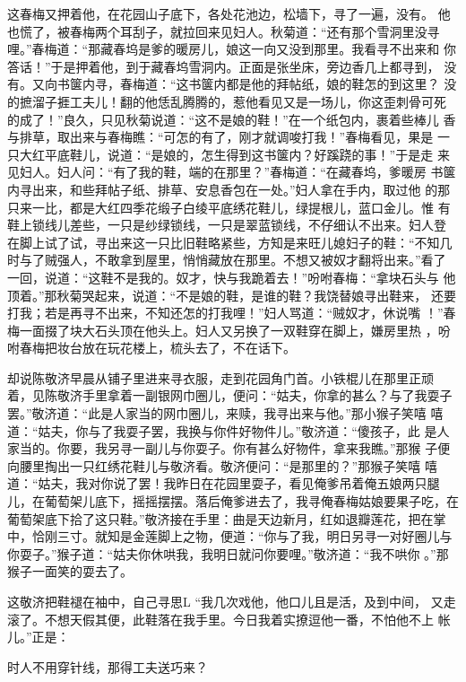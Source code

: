 这春梅又押着他，在花园山子底下，各处花池边，松墙下，寻了一遍，没有。
他也慌了，被春梅两个耳刮子，就拉回来见妇人。秋菊道：“还有那个雪洞里没寻
哩。”春梅道：“那藏春坞是爹的暖房儿，娘这一向又没到那里。我看寻不出来和
你答话！”于是押着他，到于藏春坞雪洞内。正面是张坐床，旁边香几上都寻到，
没有。又向书箧内寻，春梅道：“这书箧内都是他的拜帖纸，娘的鞋怎的到这里？
没的摭溜子捱工夫儿！翻的他恁乱腾腾的，惹他看见又是一场儿，你这歪刺骨可死
的成了！”良久，只见秋菊说道：“这不是娘的鞋！”在一个纸包内，裹着些棒儿
香与排草，取出来与春梅瞧：“可怎的有了，刚才就调唆打我！”春梅看见，果是
一只大红平底鞋儿，说道：“是娘的，怎生得到这书箧内？好蹊跷的事！”于是走
来见妇人。妇人问：“有了我的鞋，端的在那里？”春梅道：“在藏春坞，爹暖房
书箧内寻出来，和些拜帖子纸、排草、安息香包在一处。”妇人拿在手内，取过他
的那只来一比，都是大红四季花缎子白绫平底绣花鞋儿，绿提根儿，蓝口金儿。惟
有鞋上锁线儿差些，一只是纱绿锁线，一只是翠蓝锁线，不仔细认不出来。妇人登
在脚上试了试，寻出来这一只比旧鞋略紧些，方知是来旺儿媳妇子的鞋：“不知几
时与了贼强人，不敢拿到屋里，悄悄藏放在那里。不想又被奴才翻将出来。”看了
一回，说道：“这鞋不是我的。奴才，快与我跪着去！”吩咐春梅：“拿块石头与
他顶着。”那秋菊哭起来，说道：“不是娘的鞋，是谁的鞋？我饶替娘寻出鞋来，
还要打我；若是再寻不出来，不知还怎的打我哩！”妇人骂道：“贼奴才，休说嘴
！”春梅一面掇了块大石头顶在他头上。妇人又另换了一双鞋穿在脚上，嫌房里热
，吩咐春梅把妆台放在玩花楼上，梳头去了，不在话下。

却说陈敬济早晨从铺子里进来寻衣服，走到花园角门首。小铁棍儿在那里正顽
着，见陈敬济手里拿着一副银网巾圈儿，便问：“姑夫，你拿的甚么？与了我耍子
罢。”敬济道：“此是人家当的网巾圈儿，来赎，我寻出来与他。”那小猴子笑嘻
嘻道：“姑夫，你与了我耍子罢，我换与你件好物件儿。”敬济道：“傻孩子，此
是人家当的。你要，我另寻一副儿与你耍子。你有甚么好物件，拿来我瞧。”那猴
子便向腰里掏出一只红绣花鞋儿与敬济看。敬济便问：“是那里的？”那猴子笑嘻
嘻道：“姑夫，我对你说了罢！我昨日在花园里耍子，看见俺爹吊着俺五娘两只腿
儿，在葡萄架儿底下，摇摇摆摆。落后俺爹进去了，我寻俺春梅姑娘要果子吃，在
葡萄架底下拾了这只鞋。”敬济接在手里：曲是天边新月，红如退瓣莲花，把在掌
中，恰刚三寸。就知是金莲脚上之物，便道：“你与了我，明日另寻一对好圈儿与
你耍子。”猴子道：“姑夫你休哄我，我明日就问你要哩。”敬济道：“我不哄你
。”那猴子一面笑的耍去了。

这敬济把鞋褪在袖中，自己寻思L “我几次戏他，他口儿且是活，及到中间，
又走滚了。不想天假其便，此鞋落在我手里。今日我着实撩逗他一番，不怕他不上
帐儿。”正是：

时人不用穿针线，那得工夫送巧来？

